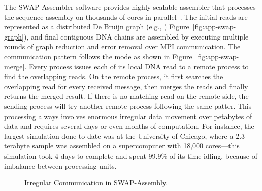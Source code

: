 The SWAP-Assembler software provides highly scalable assembler that processes
the sequence assembly on thousands of cores in parallel~\cite{swap}. The
initial reads are represented as a distributed De Bruijn graph (e.g., )
Figure~\ref{fig:app-swap-graph}), and final contiguous DNA chains are
assembled by executing multiple rounds of graph reduction and error removal
over MPI communication. The communication pattern follows the
 mode as shown in Figure~\ref{fig:app-swap-merge}.
Every process issues each of its local DNA read to a remote process to find
the overlapping reads. On the remote process, it first searches the
overlapping read for every received message, then merges the reads and
finally returns the merged result. If there is no matching read on the
remote side, the sending process will try another remote process following
the same patter. This processing always involves enormous irregular data
movement over petabytes of data and requires several days or even months of
computation. For instance, the largest simulation done to date was at the
University of Chicago, where a 2.3-terabyte sample was assembled on a
supercomputer with 18,000 cores—this simulation took 4 days to complete and
spent 99.9\% of its time idling, because of imbalance between processing
units.


\begin{figure}[ht]
\centering
{}
\caption{Irregular Communication in SWAP-Assembly.}
\label{fig:app-swap}
\end{figure}

